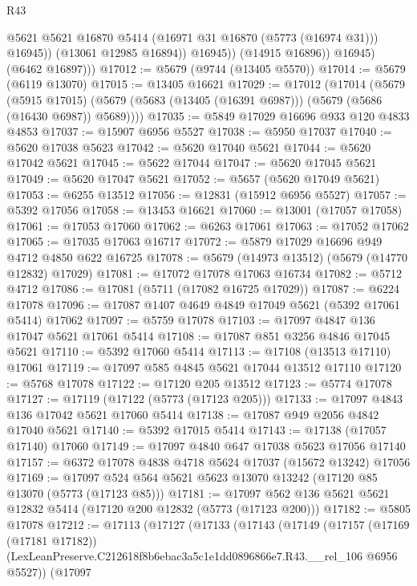 \begin{lexlean}{R43}
\begin{coremodule}
                      @5621
                      @5621
                      @16870
                      @5414
                      (@16971 @31 @16870 (@5773 (@16974 @31)))
                      @16945))
                  (@13061 @12985 @16894))
                @16945))
            (@14915 @16896))
          @16945)
        (@6462 @16897)))
@17012 := @5679 (@9744 (@13405 @5570))
@17014 := @5679 (@6119 @13070)
@17015 := @13405 @16621
@17029 := @17012
    (@17014
      (@5679
        (@5915 @17015)
        (@5679 (@5683 (@13405 (@16391 @6987))) (@5679 (@5686 (@16430 @6987)) @5689))))
@17035 := @5849 @17029 @16696 @933 @120 @4833 @4853
@17037 := @15907 @6956 @5527
@17038 := @5950 @17037
@17040 := @5620 @17038 @5623
@17042 := @5620 @17040 @5621
@17044 := @5620 @17042 @5621
@17045 := @5622 @17044
@17047 := @5620 @17045 @5621
@17049 := @5620 @17047 @5621
@17052 := @5657 (@5620 @17049 @5621)
@17053 := @6255 @13512
@17056 := @12831 (@15912 @6956 @5527)
@17057 := @5392 @17056
@17058 := @13453 @16621
@17060 := @13001 (@17057 @17058)
@17061 := @17053 @17060
@17062 := @6263 @17061
@17063 := @17052 @17062
@17065 := @17035 @17063 @16717
@17072 := @5879 @17029 @16696 @949 @4712 @4850 @622 @16725
@17078 := @5679 (@14973 @13512) (@5679 (@14770 @12832) @17029)
@17081 := @17072 @17078 @17063 @16734
@17082 := @5712 @4712
@17086 := @17081 (@5711 (@17082 @16725 @17029))
@17087 := @6224 @17078
@17096 := @17087 @1407 @4649 @4849 @17049 @5621 (@5392 @17061 @5414) @17062
@17097 := @5759 @17078
@17103 := @17097 @4847 @136 @17047 @5621 @17061 @5414
@17108 := @17087 @851 @3256 @4846 @17045 @5621
@17110 := @5392 @17060 @5414
@17113 := @17108 (@13513 @17110) @17061
@17119 := @17097 @585 @4845 @5621 @17044 @13512 @17110
@17120 := @5768 @17078
@17122 := @17120 @205 @13512
@17123 := @5774 @17078
@17127 := @17119 (@17122 (@5773 (@17123 @205)))
@17133 := @17097 @4843 @136 @17042 @5621 @17060 @5414
@17138 := @17087 @949 @2056 @4842 @17040 @5621
@17140 := @5392 @17015 @5414
@17143 := @17138 (@17057 @17140) @17060
@17149 := @17097 @4840 @647 @17038 @5623 @17056 @17140
@17157 := @6372 @17078 @4838 @4718 @5624 @17037 (@15672 @13242) @17056
@17169 := @17097 @524 @564 @5621 @5623 @13070 @13242 (@17120 @85 @13070 (@5773 (@17123 @85)))
@17181 := @17097 @562 @136 @5621 @5621 @12832 @5414 (@17120 @200 @12832 (@5773 (@17123 @200)))
@17182 := @5805 @17078
@17212 := @17113
    (@17127
      (@17133
        (@17143
          (@17149
            (@17157
              (@17169 (@17181 @17182))
              (LexLeanPreserve.C212618f8b6ebac3a5c1e1dd0896866e7.R43.__rel_106 @6956 @5527))
            (@17097

\end{coremodule}
\end{lexlean}
